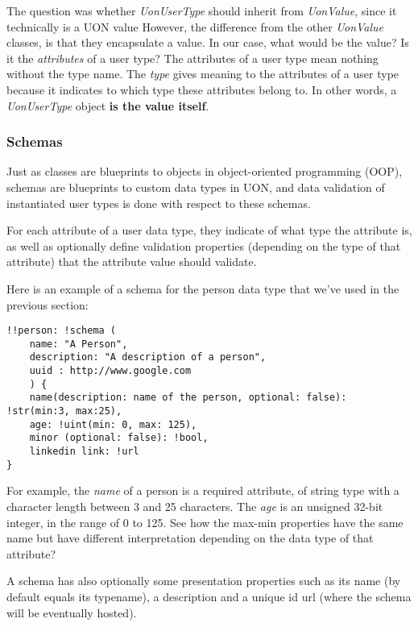 \documentclass[12pt]{article}
\begin{document}
The question was whether \emph{UonUserType} should inherit from \emph{UonValue}, since it technically is a UON value However, the difference from the other \emph{UonValue} classes, is that they encapsulate a value. In our case, what would be the value? Is it the \emph{attributes} of a user type? The attributes of a user type mean nothing without the type name. The \emph{type} gives meaning to the attributes of a user type because it indicates to which type these attributes belong to. In other words, a \emph{UonUserType} object \textbf{is the value itself}.
 
\subsubsection{Schemas}

Just as classes are blueprints to objects in object-oriented programming (OOP), schemas are blueprints to custom data types in UON, and data validation of instantiated user types is done with respect to these schemas. 

For each attribute of a user data type, they indicate of what type the attribute is, as well as optionally define validation properties (depending on the type of that attribute) that the attribute value should validate.

Here is an example of a schema for the person data type that we've used in the previous section:
\begin{lstlisting}
!!person: !schema (
    name: "A Person", 
    description: "A description of a person",
    uuid : http://www.google.com
    ) {
    name(description: name of the person, optional: false): !str(min:3, max:25),
    age: !uint(min: 0, max: 125),
    minor (optional: false): !bool,
    linkedin link: !url
}
\end{lstlisting}

For example, the \emph{name} of a person is a required attribute, of string type with a character length between 3 and 25 characters. The \emph{age} is an unsigned 32-bit integer, in the range of 0 to 125. See how the max-min properties have the same name but have different interpretation depending on the data type of that attribute? 

A schema has also optionally some presentation properties such as its name (by default equals its typename), a description and a unique id url (where the schema will be eventually hosted).
\end{document}
